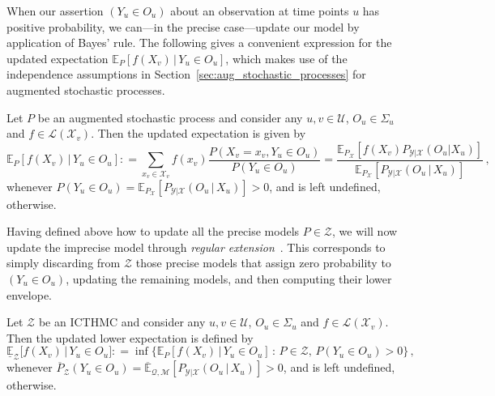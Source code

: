\documentclass[twoside,11pt]{article}
\newcommand{\states}{\mathcal{X}}
\newcommand{\observs}{\mathcal{Y}}
\newcommand{\uexp}{\overline{\mathbb{E}}_{\rateset,\mathcal{M}}}
\newcommand{\gambles}{\mathcal{L}}
\newcommand{\rateset}{\mathcal{Q}}
\newcommand{\coloneqq}{:\!=}
\begin{document}
When our assertion $(Y_u\in O_u)$ about an observation at time points $u$ has positive probability, we can---in the precise case---update our model by application of Bayes' rule. The following gives a convenient expression for the updated expectation $\mathbb{E}_P[f(X_v)\,\vert\,Y_u\in O_u]$, which makes use of the independence assumptions in Section~\ref{sec:aug_stochastic_processes} for augmented stochastic processes.
\begin{proposition}\label{prop:precise_conditioning_for_positive}
Let $P$ be an augmented stochastic process and consider any $u,v\in\mathcal{U}$, $O_u\in\Sigma_u$ and $f\in\gambles(\states_v)$. Then the updated expectation is given by
\begin{equation*}
\mathbb{E}_P[f(X_v)\,\vert\,Y_u\in O_u] \coloneqq \sum_{x_v\in\states_v}f(x_v)\frac{P(X_v=x_v, Y_u\in O_u)}{P(Y_u\in O_u)} = \frac{\mathbb{E}_{P_\states}[f(X_v)P_{\observs\vert\states}(O_u\vert X_u)]}{\mathbb{E}_{P_\states}[P_{\observs\vert\states}(O_u\,\vert\,X_u)]}\,,
\end{equation*}
whenever $P(Y_u\in O_u)=\mathbb{E}_{P_\states}[P_{\observs\vert\states}(O_u\,\vert\,X_u)]>0$, and is left undefined, otherwise.
\end{proposition}

Having defined above how to update all the precise models $P\in\mathcal{Z}$, we will now update the imprecise model through \emph{regular extension}~\citep{Walley:1991vk}. This corresponds to simply discarding from $\mathcal{Z}$ those precise models that assign zero probability to $(Y_u\in O_u)$, updating the remaining models, and then computing their lower envelope.

\begin{definition}\label{def:reg_ext_pos}
Let $\mathcal{Z}$ be an ICTHMC and consider any $u,v\in\mathcal{U}$, $O_u\in\Sigma_u$ and $f\in\gambles(\states_v)$. Then the updated lower expectation is defined by
\begin{equation*}
\underline{\mathbb{E}}_{\mathcal{Z}}\bigl[f(X_v)\,\vert\,Y_u\in O_u\bigr] \coloneqq \inf\bigl\{ \mathbb{E}_P[f(X_v)\,\vert\,Y_u\in O_u]\,:\, P\in\mathcal{Z},\, P(Y_u\in O_u)>0 \bigr\}\,,
\end{equation*}
whenever $\overline{P}_\mathcal{Z}(Y_u\in O_u)=\uexp[P_{\observs\vert\states}(O_u\,\vert\,X_u)]>0$, and is left undefined, otherwise.
\end{definition}
\end{document}
